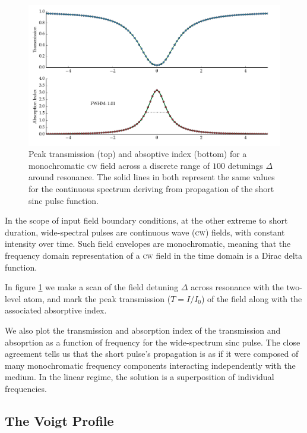     \begin{figure}[]
    \includegraphics[width=\linewidth]{figs/02_propagation/two_mb_solve_scan_a00_fig1.pdf}
    \caption{
    Peak transmission (top) and absoptive index (bottom) for a monochromatic
    \textsc{cw} field across a discrete range of $100$ detunings $\Delta$ around
    resonance. The solid lines in both represent the same values for the
    continuous spectrum deriving from propagation of the short sinc pulse
    function.
    }
    \label{fig:linear_cw_scan_trans}
    \end{figure}

    In the scope of input field boundary conditions, at the other extreme to
    short duration, wide-spectral pulses are continuous wave (\textsc{cw})
    fields, with constant intensity over time. Such field envelopes are
    monochromatic, meaning that the frequency domain representation of a
    \textsc{cw} field in the time domain is a Dirac delta function.

    In figure \ref{fig:linear_cw_scan_trans} we make a scan of the field
    detuning $\Delta$ across resonance with the two-level atom, and mark the
    peak transmission ($T = I/I_0$) of the field along with the associated
    absorptive index.

    We also plot the transmission and absorption index of the transmission and
    absoprtion as a function of frequency for the wide-spectrum sinc pulse. The
    close agreement tells us that the short pulse's propagation is as if it were
    composed of many monochromatic frequency components interacting
    independently with the medium. In the linear regime, the solution is a
    superposition of individual frequencies.\cite{boyd2008nonlinear}

  \subsection{The Voigt Profile} %

